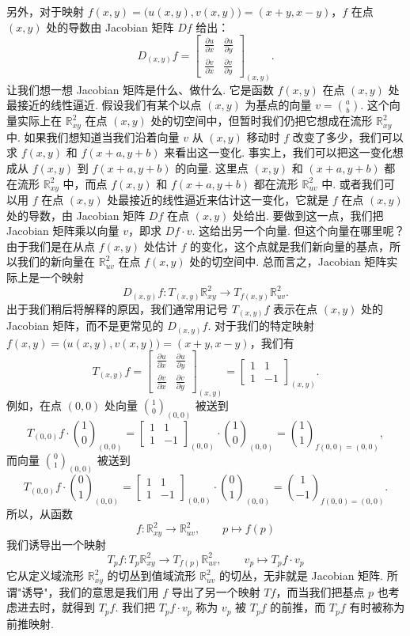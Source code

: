 另外，对于映射 $f(x,y)=\bigl(u(x,y),v(x,y)\bigr)=(x+y,x-y)$，$f$ 在点 $(x,y)$ 处的导数由 Jacobian 矩阵 $Df$ 给出：
\[
D_{(x,y)}f=
\begin{bmatrix}
\frac{\partial u}{\partial x}&\frac{\partial u}{\partial y}\\
\frac{\partial v}{\partial x}&\frac{\partial v}{\partial y}
\end{bmatrix}_{(x,y)}.
\]
让我们想一想 Jacobian 矩阵是什么、做什么. 它是函数 $f(x,y)$ 在点 $(x,y)$ 处最接近的线性逼近. 假设我们有某个以点 $(x,y)$ 为基点的向量 $v=\binom{a}{b}$. 这个向量实际上在 $\mathbb{R}^2_{xy}$ 在点 $(x,y)$ 处的切空间中，但暂时我们仍把它想成在流形 $\mathbb{R}^2_{xy}$ 中. 如果我们想知道当我们沿着向量 $v$ 从 $(x,y)$ 移动时 $f$ 改变了多少，我们可以求 $f(x,y)$ 和 $f(x+a,y+b)$ 来看出这一变化. 事实上，我们可以把这一变化想成从 $f(x,y)$ 到 $f(x+a,y+b)$ 的向量. 这里点 $(x,y)$ 和 $(x+a,y+b)$ 都在流形 $\mathbb{R}^2_{xy}$ 中，而点 $f(x,y)$ 和 $f(x+a,y+b)$ 都在流形 $\mathbb{R}^2_{uv}$ 中. 或者我们可以用 $f$ 在点 $(x,y)$ 处最接近的线性逼近来估计这一变化，它就是 $f$ 在点 $(x,y)$ 处的导数，由 Jacobian 矩阵 $Df$ 在点 $(x,y)$ 处给出. 要做到这一点，我们把 Jacobian 矩阵乘以向量 $v$，即求 $Df\cdot v$. 这给出另一个向量. 但这个向量在哪里呢？由于我们是在从点 $f(x,y)$ 处估计 $f$ 的变化，这个点就是我们新向量的基点，所以我们的新向量在 $\mathbb{R}^2_{uv}$ 在点 $f(x,y)$ 处的切空间中. 总而言之，Jacobian 矩阵实际上是一个映射
\[
D_{(x,y)}f:T_{(x,y)}\mathbb{R}^2_{xy}\longrightarrow T_{f(x,y)}\mathbb{R}^2_{uv}.
\]
出于我们稍后将解释的原因，我们通常用记号 $T_{(x,y)}f$ 表示在点 $(x,y)$ 处的 Jacobian 矩阵，而不是更常见的 $D_{(x,y)}f$. 对于我们的特定映射 $f(x,y)=\bigl(u(x,y),v(x,y)\bigr)=(x+y,x-y)$，我们有
\[
T_{(x,y)}f=
\begin{bmatrix}
\frac{\partial u}{\partial x}&\frac{\partial u}{\partial y}\\
\frac{\partial v}{\partial x}&\frac{\partial v}{\partial y}
\end{bmatrix}_{(x,y)}
=
\begin{bmatrix}
1&1\\
1&-1
\end{bmatrix}_{(x,y)}.
\]
例如，在点 $(0,0)$ 处向量 $\binom{1}{0}_{(0,0)}$ 被送到
\[
T_{(0,0)}f\cdot\binom{1}{0}_{(0,0)}
=
\begin{bmatrix}
1&1\\
1&-1
\end{bmatrix}_{(0,0)}
\cdot\binom{1}{0}_{(0,0)}
=
\binom{1}{1}_{f(0,0)=(0,0)},
\]
而向量 $\binom{0}{1}_{(0,0)}$ 被送到
\[
T_{(0,0)}f\cdot\binom{0}{1}_{(0,0)}
=
\begin{bmatrix}
1&1\\
1&-1
\end{bmatrix}_{(0,0)}
\cdot\binom{0}{1}_{(0,0)}
=
\binom{1}{-1}_{f(0,0)=(0,0)}.
\]
所以，从函数
\[
f:\mathbb{R}^2_{xy}\longrightarrow\mathbb{R}^2_{uv},\qquad p\longmapsto f(p)
\]
我们诱导出一个映射
\[
T_pf:T_p\mathbb{R}^2_{xy}\longrightarrow T_{f(p)}\mathbb{R}^2_{uv},\qquad
v_p\longmapsto T_pf\cdot v_p
\]
它从定义域流形 $\mathbb{R}^2_{xy}$ 的切丛到值域流形 $\mathbb{R}^2_{uv}$ 的切丛，无非就是 Jacobian 矩阵. 所谓"诱导"，我们的意思是我们用 $f$ 导出了另一个映射 $Tf$，而当我们把基点 $p$ 也考虑进去时，就得到 $T_pf$. 我们把 $T_pf\cdot v_p$ 称为 $v_p$ 被 $T_pf$ 的前推，而 $T_pf$ 有时被称为前推映射.

